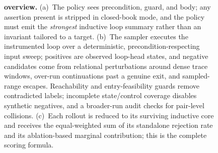 \begin{figure}[t]
{
}%
\caption{\textbf{\sam{} overview.}
(a)~The policy sees precondition, guard, and body; any assertion present is stripped in closed-book mode, and the policy must emit the \emph{strongest} inductive loop summary rather than an invariant tailored to a target.
(b)~The sampler executes the instrumented loop over a deterministic, precondition-respecting input sweep; positives are observed loop-head states, and negative candidates come from relational perturbations around dense trace windows, over-run continuations past a genuine exit, and sampled-range escapes.
Reachability and entry-feasibility guards remove contradicted labels; incomplete state/control coverage disables synthetic negatives, and a broader-run audit checks for pair-level collisions.
(c)~Each rollout is reduced to its surviving inductive core and receives the equal-weighted sum of its standalone rejection rate and its ablation-based marginal contribution; this is the complete scoring formula.}
\label{fig:overview}
\end{figure}
